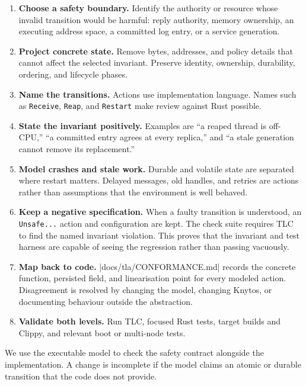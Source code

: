\begin{enumerate}
    \item \textbf{Choose a safety boundary.} Identify the authority or resource
        whose invalid transition would be harmful: reply authority, memory
        ownership, an executing address space, a committed log entry, or a
        service generation.
    \item \textbf{Project concrete state.} Remove bytes, addresses, and policy
        details that cannot affect the selected invariant. Preserve identity,
        ownership, durability, ordering, and lifecycle phases.
    \item \textbf{Name the transitions.} Actions use implementation language.
        Names such as \texttt{Receive}, \texttt{Reap}, and \texttt{Restart}
        make review against Rust possible.
    \item \textbf{State the invariant positively.} Examples are ``a reaped
        thread is off-CPU,'' ``a committed entry agrees at every replica,'' and
        ``a stale generation cannot remove its replacement.''
    \item \textbf{Model crashes and stale work.} Durable and volatile state are
        separated where restart matters. Delayed messages, old handles, and
        retries are actions rather than assumptions that the environment is
        well behaved.
    \item \textbf{Keep a negative specification.} When a faulty transition is
        understood, an \texttt{Unsafe...} action and configuration are kept.
        The check suite requires TLC to find the named invariant violation.
        This proves that the invariant and test harness are capable of seeing
        the regression rather than passing vacuously.
    \item \textbf{Map back to code.} \repofile|docs/tla/CONFORMANCE.md| records
        the concrete function, persisted field, and linearisation point for
        every modeled action. Disagreement is resolved by changing the model,
        changing Knytos, or documenting behaviour outside the abstraction.
    \item \textbf{Validate both levels.} Run TLC, focused Rust tests, target
        builds and Clippy, and relevant boot or multi-node tests.
\end{enumerate}

We use the executable model to check the safety contract alongside the
implementation. A change is incomplete if
the model claims an atomic or durable transition that the code does not
provide.

